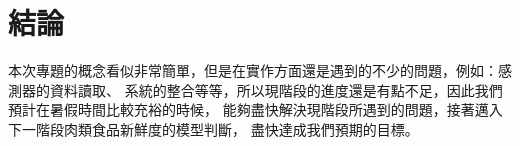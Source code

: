 \chapter{結論}

本次專題的概念看似非常簡單，但是在實作方面還是遇到的不少的問題，例如：感測器的資料讀取、
系統的整合等等，所以現階段的進度還是有點不足，因此我們預計在暑假時間比較充裕的時候，
能夠盡快解決現階段所遇到的問題，接著邁入下一階段肉類食品新鮮度的模型判斷，
盡快達成我們預期的目標。